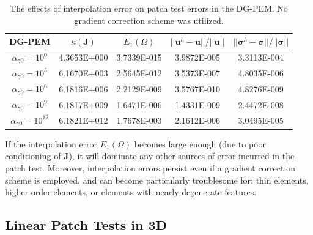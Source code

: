 \begin{table}[!ht]
  \begin{center}
    \begin{tabular}{| c || c | c | c | c |}
    \hline
    DG-PEM & $\kappa(\mathbf{J})$ &  $E_1 (\Omega)$ & $||\mathbf{u}^h - \mathbf{u}|| / ||\mathbf{u}||$ & $||\boldsymbol{\sigma}^h - \boldsymbol{\sigma}|| / ||\boldsymbol{\sigma}||$ \\ \hline \hline
    $\alpha_{\gamma0} = 10^{0}$ & 4.3653E+000 & 3.7339E-015 & 3.9872E-005 & 3.3113E-004 \\ \hline
    $\alpha_{\gamma0} = 10^{3}$ & 6.1670E+003 & 2.5645E-012 & 3.5373E-007 & 4.8035E-006 \\ \hline
    $\alpha_{\gamma0} = 10^{6}$ & 6.1816E+006 & 2.2129E-009 & 3.5767E-010 & 4.8276E-009 \\ \hline
    $\alpha_{\gamma0} = 10^{9}$ & 6.1817E+009 & 1.6471E-006 & 1.4331E-009 & 2.4472E-008 \\ \hline
    $\alpha_{\gamma0} = 10^{12}$ & 6.1821E+012 & 1.7678E-003 & 2.1612E-006 & 3.0495E-005 \\
    \hline
    \end{tabular}
    \caption{The effects of interpolation error on patch test errors in the DG-PEM. No gradient correction scheme was utilized.}
    \vspace{-5pt}
    \label{tab:interpolation_patch_test_error}
    \vspace{-25pt}
  \end{center}
\end{table}

If the interpolation error $E_1 (\Omega)$ becomes large enough (due to poor conditioning of $\mathbf{J}$), it will dominate any other sources of error incurred in the patch test. Moreover, interpolation errors persist even if a gradient correction scheme is employed, and can become particularly troublesome for: thin elements, higher-order elements, or elements with nearly degenerate features.

\subsection*{Linear Patch Tests in 3D}

